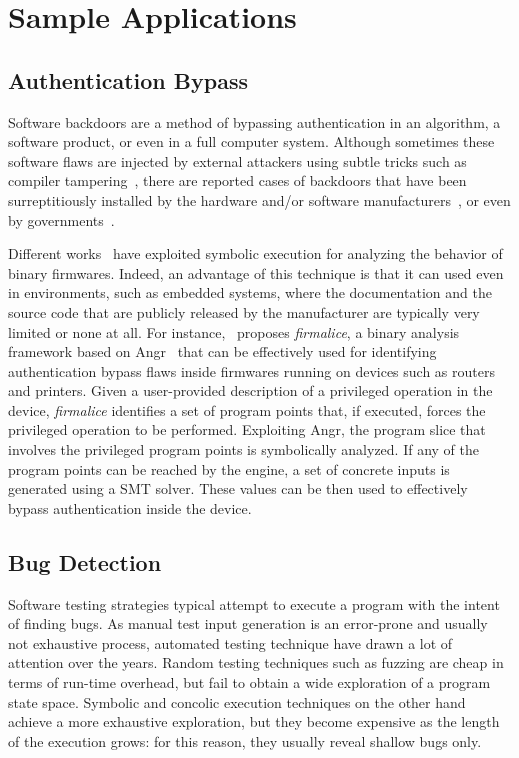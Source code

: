 
\section{Sample Applications}
\label{se:applications}

\subsection{Authentication Bypass}
\label{ss:auth-bypass}
Software backdoors are a method of bypassing authentication in an algorithm, a software product, or even in a full computer system. Although sometimes these software flaws are injected by external attackers using subtle tricks such as compiler tampering~\cite{KRS-TR74}, there are reported cases of backdoors that have been surreptitiously installed by the hardware and/or software manufacturers~\cite{CZF-USEC14}, or even by governments~\cite{NSA-BACKDOOR}. 

Different works~\cite{ZBF-NDSS14,DMR-USEC13,FIRMALICE-NDSS15} have exploited symbolic execution for analyzing the behavior of binary firmwares. Indeed, an advantage of this technique is that it can used even in environments, such as embedded systems, where the documentation and the source code that are publicly released by the manufacturer are typically very limited or none at all. For instance,~\cite{FIRMALICE-NDSS15} proposes {\em firmalice}, a binary analysis framework based on {\sc Angr}~\cite{ANGR-SSP16} that can be effectively used for identifying authentication bypass flaws inside firmwares running on devices such as routers and printers. Given a user-provided description of a privileged operation in the device, {\em firmalice} identifies a set of program points that, if executed, forces the privileged operation to be performed. Exploiting {\sc Angr}, the program slice that involves the privileged program points is symbolically analyzed. If any of the program points can be reached by the engine, a set of concrete inputs is generated using a SMT solver. These values can be then used to effectively bypass authentication inside the device.


\subsection{Bug Detection}
\label{ss:bug-detection}

Software testing strategies typical attempt to execute a program with the intent of finding bugs. As manual test input generation is an error-prone and usually not exhaustive process, automated testing technique have drawn a lot of attention over the years. Random testing techniques such as fuzzing are cheap in terms of run-time overhead, but fail to obtain a wide exploration of a program state space. Symbolic and concolic execution techniques on the other hand achieve a more exhaustive exploration, but they become expensive as the length of the execution grows: for this reason, they usually reveal shallow bugs only.

